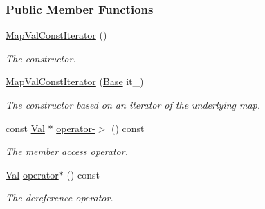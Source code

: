 \subsubsection*{Public Member Functions}
\begin{DoxyCompactItemize}
\item 
\hyperlink{structslb_1_1core_1_1util_1_1MapValConstIterator_a1a6a72902be9911c77302e9e9b2ecae3}{Map\+Val\+Const\+Iterator} ()\hypertarget{structslb_1_1core_1_1util_1_1MapValConstIterator_a1a6a72902be9911c77302e9e9b2ecae3}{}\label{structslb_1_1core_1_1util_1_1MapValConstIterator_a1a6a72902be9911c77302e9e9b2ecae3}

\begin{DoxyCompactList}\small\item\em The constructor. \end{DoxyCompactList}\item 
\hyperlink{structslb_1_1core_1_1util_1_1MapValConstIterator_ab6cb354f171629bb9f9bbf3842d3e0f9}{Map\+Val\+Const\+Iterator} (\hyperlink{structslb_1_1core_1_1util_1_1MapValConstIterator_aff0eec057adf9aa4faa210e9b4d7fe2a}{Base} it\+\_\+)\hypertarget{structslb_1_1core_1_1util_1_1MapValConstIterator_ab6cb354f171629bb9f9bbf3842d3e0f9}{}\label{structslb_1_1core_1_1util_1_1MapValConstIterator_ab6cb354f171629bb9f9bbf3842d3e0f9}

\begin{DoxyCompactList}\small\item\em The constructor based on an iterator of the underlying map. \end{DoxyCompactList}\item 
const \hyperlink{structslb_1_1core_1_1util_1_1MapValConstIterator_a61fb33250db807633298a4e573695e5b}{Val} $\ast$ \hyperlink{structslb_1_1core_1_1util_1_1MapValConstIterator_a5d0bd65fc466713f3617919505c66d66}{operator-\/$>$} () const 
\begin{DoxyCompactList}\small\item\em The member access operator. \end{DoxyCompactList}\item 
\hyperlink{structslb_1_1core_1_1util_1_1MapValConstIterator_a61fb33250db807633298a4e573695e5b}{Val} \hyperlink{structslb_1_1core_1_1util_1_1MapValConstIterator_a8ceeedbc95adff11cbcf8ee68a2e486d}{operator$\ast$} () const 
\begin{DoxyCompactList}\small\item\em The dereference operator. \end{DoxyCompactList}\end{DoxyCompactItemize}


